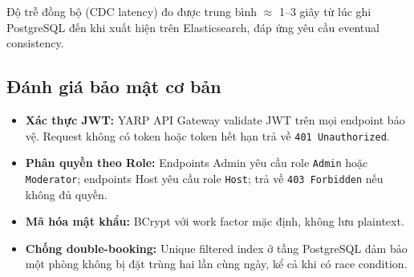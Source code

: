 Độ trễ đồng bộ (CDC latency) đo được trung bình $\approx$ 1--3 giây từ lúc ghi PostgreSQL đến khi xuất hiện trên Elasticsearch, đáp ứng yêu cầu eventual consistency.

\subsection{Đánh giá bảo mật cơ bản}
\label{subsec:danh_gia_bao_mat}

\begin{itemize}
    \item \textbf{Xác thực JWT:} YARP API Gateway validate JWT trên mọi endpoint bảo vệ. Request không có token hoặc token hết hạn trả về \texttt{401 Unauthorized}.
    \item \textbf{Phân quyền theo Role:} Endpoints Admin yêu cầu role \texttt{Admin} hoặc \texttt{Moderator}; endpoints Host yêu cầu role \texttt{Host}; trả về \texttt{403 Forbidden} nếu không đủ quyền.
    \item \textbf{Mã hóa mật khẩu:} BCrypt với work factor mặc định, không lưu plaintext.
    \item \textbf{Chống double-booking:} Unique filtered index ở tầng PostgreSQL đảm bảo một phòng không bị đặt trùng hai lần cùng ngày, kể cả khi có race condition.
\end{itemize}
